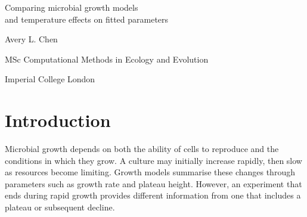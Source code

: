 \documentclass[11pt,a4paper]{article}
\begin{document}
\begin{titlepage}
\centering
\vspace*{2.3cm}
{\LARGE Comparing microbial growth models\\[0.4cm]
and temperature effects on fitted parameters\par}
\vspace{1.8cm}
{\large Avery L. Chen\par}
\vspace{0.2cm}
{\large MSc Computational Methods in Ecology and Evolution\par}
{\large Imperial College London\par}
\vspace{1.3cm}

\vfill
\end{titlepage}
\linenumbers

\begin{abstract}
Microbial growth curves differ in their observed growth phases and measurement scales, which can affect model comparison and parameter interpretation. I compared exponential, logistic and Gompertz models using nonlinear least squares on a compiled dataset containing 4,387 observations and 305 curves from ten studies. A common screening rule retained 290 curves; 284 had complete three-model comparisons. Logistic had the lowest corrected Akaike information criterion (AICc) in 123 curves, Gompertz in 92 and exponential in 69. Removing comparisons with numerical warnings retained the same overall ranking. Model preference varied across supplied species labels, but species and study effects were not separated statistically. A separate temperature analysis used logistic parameters from comparable optical-density curves in one study. Strict screening retained 41 of 88 curves and eight series with at least three temperatures. All eight had positive descriptive slopes of log growth rate against temperature, although individual series were not always monotonic. Plateau estimates showed less consistent temperature patterns. Bounded models were preferred for most curves, but could not follow growth followed by decline. The temperature results describe selected experimental series and OD-based parameters rather than a general response across the compiled dataset.
\end{abstract}

\section{Introduction}
Microbial growth depends on both the ability of cells to reproduce and the conditions in which they grow. A culture may initially increase rapidly, then slow as resources become limiting. Growth models summarise these changes through parameters such as growth rate and plateau height. However, an experiment that ends during rapid growth provides different information from one that includes a plateau or subsequent decline.
\end{document}
